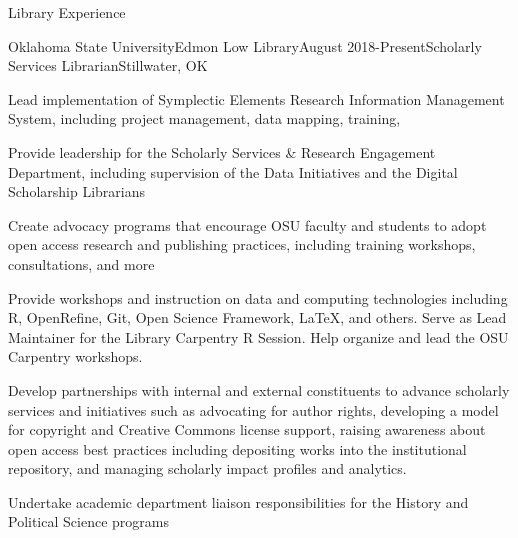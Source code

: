 \documentclass{resume} %
\begin{document}
\begin{rSection}{Library Experience}
\raggedright

\begin{rSubsection}{Oklahoma State University}{Edmon Low Library}{August 2018-Present}{Scholarly Services Librarian}{Stillwater, OK}
\item Lead implementation of Symplectic Elements Research Information Management System, including project management, data mapping, training, 
\item Provide leadership for the Scholarly Services \& Research Engagement Department, including supervision of the Data Initiatives and the Digital Scholarship Librarians
\item Create advocacy programs that encourage OSU faculty and students to adopt open access research and publishing practices, including training workshops, consultations, and more
\item Provide workshops and instruction on data and computing technologies including R, OpenRefine, Git, Open Science Framework, \LaTeX, and others. Serve as Lead Maintainer for the Library Carpentry R Session. Help organize and lead the OSU Carpentry workshops. 
\item Develop partnerships with internal and external constituents to advance scholarly services and initiatives such as advocating for author rights, developing a model for copyright and Creative Commons license support, raising awareness about open access best practices including depositing works into the institutional repository, and managing scholarly impact profiles and analytics.
\item Undertake academic department liaison responsibilities for the History and Political Science programs
\end{rSubsection}

\pagebreak


\end{rSection}
\end{document}
